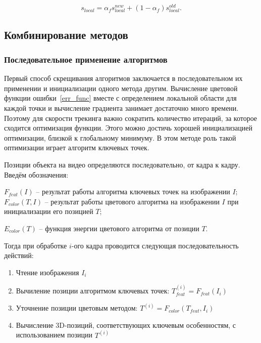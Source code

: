 \begin{equation}
s_{local} =  \alpha_f s_{local}^{new} + (1 - \alpha_f)  s_{local}^{old} 
\text{.}
\end{equation}


\subsection{Комбинирование методов}

\subsubsection{Последовательное применение алгоритмов}


Первый способ скрещивания алгоритмов заключается в последовательном их
применении и инициализации одного метода другим.
Вычисление цветовой функции ошибки~\ref{err_func} вместе с определением
локальной области для каждой точки и вычисление градиента занимает достаточно
много времени.
Поэтому для скорости трекинга важно сократить количество итераций, за которое
сходится оптимизация функции.
Этого можно достичь хорошей инициализацией оптимизации, близкой к глобальному
минимуму.
В этом методе роль такой оптимизации играет алгоритм ключевых точек.


Позиции объекта на видео определяются последовательно, от кадра к кадру.
Введём обозначения:

$F_{feat}(I)$ -- результат работы алгоритма ключевых точек на изображении $I$;
$F_{color}(T, I)$ -- результат работы цветового алгоритма на изображении $I$
при инициализации его позицией $T$;

$E_{color}(T)$ -- функция энергии цветового алгоритма от позиции $T$.

Тогда при обработке $i$-ого кадра проводится следующая последовательность
действий:

\begin{enumerate}
\item Чтение изображения $I_i$
\item Вычиление позиции алгоритмом ключевых точек:
    $T_{feat}^{(i)} = F_{feat}(I_i)$
\item Уточнение позиции цветовым методом:
    $T^{(i)} = F_{color}(T_{feat}, I_i)$
\item Вычисление  3D-позиций, соответствующих ключевым особенностям, с
    использованием позиции $T^{(i)}$
\end{enumerate}

